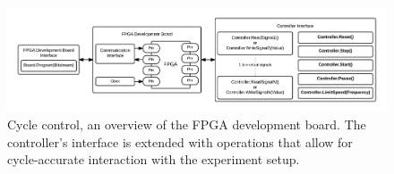 \documentclass[openright]{template/uva-bachelor-thesis}
\begin{document}
\begin{figure}[h!]
\centering
\includegraphics[width=\textwidth]{img/overview-control}
\caption{Cycle control, an overview of the FPGA development board. The controller's interface is extended with operations that allow for cycle-accurate interaction with the experiment setup.}
\label{fig:overview-control}
\end{figure}







\end{document}
